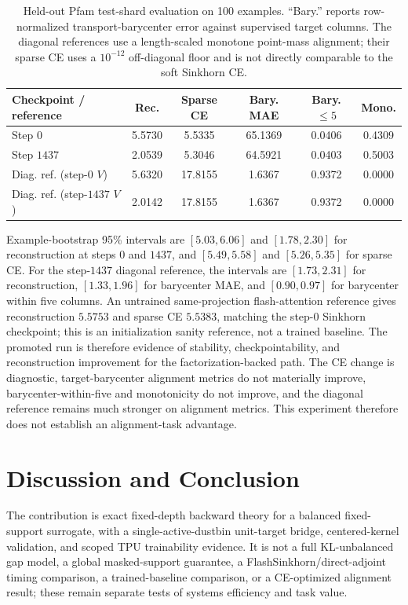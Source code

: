 \begin{table}[h]
    \centering
    \begin{tabular}{@{}lccccc@{}}
        \toprule
        Checkpoint / reference & Rec. & Sparse CE & Bary. MAE & Bary. $\le 5$ & Mono. \\
        \midrule
        Step $0$ & 5.5730 & 5.5335 & 65.1369 & 0.0406 & 0.4309 \\
        Step $1437$ & 2.0539 & 5.3046 & 64.5921 & 0.0403 & 0.5003 \\
        Diag. ref. (step-$0$ $V$) & 5.6320 & 17.8155 & 1.6367 & 0.9372 & 0.0000 \\
        Diag. ref. (step-$1437$ $V$) & 2.0142 & 17.8155 & 1.6367 & 0.9372 & 0.0000 \\
        \bottomrule
    \end{tabular}
    \caption{Held-out Pfam test-shard evaluation on 100 examples. ``Bary.'' reports row-normalized transport-barycenter error against supervised target columns. The diagonal references use a length-scaled monotone point-mass alignment; their sparse CE uses a $10^{-12}$ off-diagonal floor and is not directly comparable to the soft Sinkhorn CE.}
    \label{tab:heldout_promoted}
\end{table}

Example-bootstrap 95\% intervals are $[5.03,6.06]$ and $[1.78,2.30]$ for reconstruction at steps $0$ and $1437$, and $[5.49,5.58]$ and $[5.26,5.35]$ for sparse CE. For the step-$1437$ diagonal reference, the intervals are $[1.73,2.31]$ for reconstruction, $[1.33,1.96]$ for barycenter MAE, and $[0.90,0.97]$ for barycenter within five columns. An untrained same-projection flash-attention reference gives reconstruction $5.5753$ and sparse CE $5.5383$, matching the step-$0$ Sinkhorn checkpoint; this is an initialization sanity reference, not a trained baseline. The promoted run is therefore evidence of stability, checkpointability, and reconstruction improvement for the factorization-backed path. The CE change is diagnostic, target-barycenter alignment metrics do not materially improve, barycenter-within-five and monotonicity do not improve, and the diagonal reference remains much stronger on alignment metrics. This experiment therefore does not establish an alignment-task advantage.

\section{Discussion and Conclusion}

The contribution is exact fixed-depth backward theory for a balanced fixed-support surrogate, with a single-active-dustbin unit-target bridge, centered-kernel validation, and scoped TPU trainability evidence. It is not a full KL-unbalanced gap model, a global masked-support guarantee, a FlashSinkhorn/direct-adjoint timing comparison, a trained-baseline comparison, or a CE-optimized alignment result; these remain separate tests of systems efficiency and task value.

